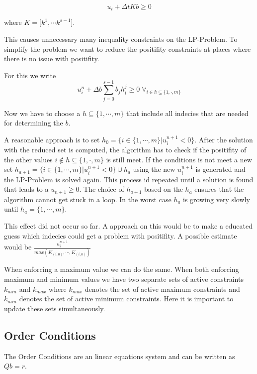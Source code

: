 \documentclass{article}
\begin{document}
\begin{equation}
u_i + \Delta t K  b \geq 0     
\end{equation}

where $K = \big[k^1 , \cdots k^{s-1}\big]$.


This causes unnecessary many inequality constraints on the LP-Problem. To simplify the problem we want to reduce the positifity constraints at places where there is no issue with positifity.

For this we write
\begin{equation}
u_i^n + \Delta b \sum_{j=0}^{s-1} b_j h_i^j  \geq 0   \;   \forall_{i \in h \subseteq \{1,\cdot,m \}} 
\end{equation}

Now we have to choose a $h \subseteq \{1,\cdots,m \}$ that include all indecies that are needed for determining the $b$.

A reasonable approach is to set $h_0 = \{ i \in \{1,\cdots,m \} |  u_i^{n+1}  < 0 \}$. 
After the solution with the reduced set is computed, the algorithm has to check if the positifity of the other values $i \notin h \subseteq \{1,\cdot,m \}$ is still meet. 
If the conditions is not meet a new set $h_{a+1} = \{ i \in \{1,\cdots,m \}|  u_i^{n+1}  < 0 \} \cup h_{a}$ using the new $u_i^{n+1}$ is generated and the LP-Problem is solved again. This process id repeated until a solution is found that leads to a $u_{n+1} \geq 0$. The choice of $h_{a+1}$ based on the $h_{a}$ ensures that the algorithm cannot get stuck in a loop. In the worst case $h_a$ is growing very slowly until $h_a = \{1,\cdots,m \}$. 

This effect did not occur so far. A approach on this would be to make a educated guess which indecies could get a problem with positifity. A possible estimate would be $\frac{u_i^{n+1}}{max(K_{(i,0)}, \cdots ,K_{(i,0)})} $ 

When enforcing a maximum value we can do the same. When both enforcing maximum and minimum values we have two separate sets of active constraints $k_{min}$ and $k_{max}$ where $k_{max}$ denotes the set of active maximum constraints and $k_{min}$ denotes the set of active minimum constraints. 
Here it is important to update these sets simultaneously.  


\subsection{Order Conditions}

The Order Conditions are an linear equations system and can be written as $Q b = r$. 
\end{document}
